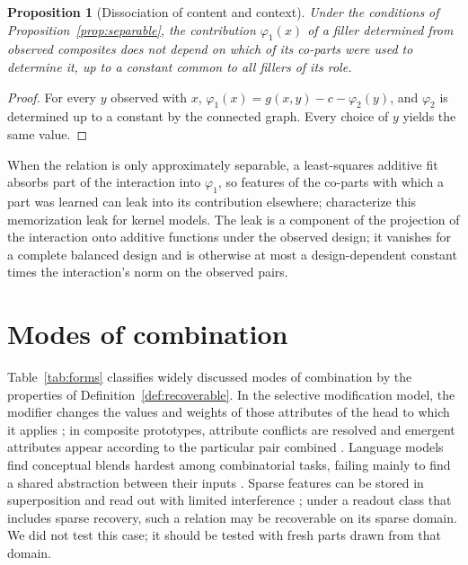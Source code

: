 \documentclass[10pt]{article}
\theoremstyle{plain}
\newtheorem{proposition}{Proposition}
\theoremstyle{remark}
\begin{document}
\begin{proposition}[Dissociation of content and context]
\label{prop:context}
Under the conditions of Proposition~\ref{prop:separable}, the contribution $\varphi_1(x)$ of a filler determined from observed composites does not depend on which of its co-parts were used to determine it, up to a constant common to all fillers of its role.
\end{proposition}

\begin{proof}
For every $y$ observed with $x$, $\varphi_1(x) = g(x, y) - c - \varphi_2(y)$, and $\varphi_2$ is determined up to a constant by the connected graph. Every choice of $y$ yields the same value.
\end{proof}

\noindent
When the relation is only approximately separable, a least-squares additive fit absorbs part of the interaction into $\varphi_1$, so features of the co-parts with which a part was learned can leak into its contribution elsewhere; \citet{lippl2025} characterize this memorization leak for kernel models. The leak is a component of the projection of the interaction onto additive functions under the observed design; it vanishes for a complete balanced design and is otherwise at most a design-dependent constant times the interaction's norm on the observed pairs.

\section{Modes of combination}
\label{app:forms}

Table~\ref{tab:forms} classifies widely discussed modes of combination by the properties of Definition~\ref{def:recoverable}. In the selective modification model, the modifier changes the values and weights of those attributes of the head to which it applies \citep{smith1988}; in composite prototypes, attribute conflicts are resolved and emergent attributes appear according to the particular pair combined \citep{hampton1987}. Language models find conceptual blends hardest among combinatorial tasks, failing mainly to find a shared abstraction between their inputs \citep{schapiro2025}. Sparse features can be stored in superposition and read out with limited interference \citep{elhage2022}; under a readout class that includes sparse recovery, such a relation may be recoverable on its sparse domain. We did not test this case; it should be tested with fresh parts drawn from that domain.
\end{document}
